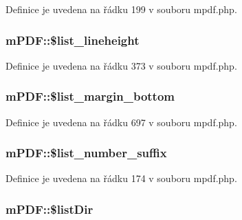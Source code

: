 Definice je uvedena na řádku 199 v souboru mpdf.\-php.

\hypertarget{classm_p_d_f_a7c00e14f9a2182db08779630dbaab245}{
\subsubsection[{\$list\-\_\-lineheight}]{\setlength{\rightskip}{0pt plus 5cm}m\-P\-D\-F\-::\$list\-\_\-lineheight}}\label{classm_p_d_f_a7c00e14f9a2182db08779630dbaab245}


Definice je uvedena na řádku 373 v souboru mpdf.\-php.

\hypertarget{classm_p_d_f_a09e714e258ef6408b945ab7f71048f04}{
\subsubsection[{\$list\-\_\-margin\-\_\-bottom}]{\setlength{\rightskip}{0pt plus 5cm}m\-P\-D\-F\-::\$list\-\_\-margin\-\_\-bottom}}\label{classm_p_d_f_a09e714e258ef6408b945ab7f71048f04}


Definice je uvedena na řádku 697 v souboru mpdf.\-php.

\hypertarget{classm_p_d_f_a50ca5c3a551a5451d52fa6173f548249}{
\subsubsection[{\$list\-\_\-number\-\_\-suffix}]{\setlength{\rightskip}{0pt plus 5cm}m\-P\-D\-F\-::\$list\-\_\-number\-\_\-suffix}}\label{classm_p_d_f_a50ca5c3a551a5451d52fa6173f548249}


Definice je uvedena na řádku 174 v souboru mpdf.\-php.

\hypertarget{classm_p_d_f_ada3bc9f66de84851b9e1e4726fa506b0}{
\subsubsection[{\$list\-Dir}]{\setlength{\rightskip}{0pt plus 5cm}m\-P\-D\-F\-::\$list\-Dir}}\label{classm_p_d_f_ada3bc9f66de84851b9e1e4726fa506b0}


